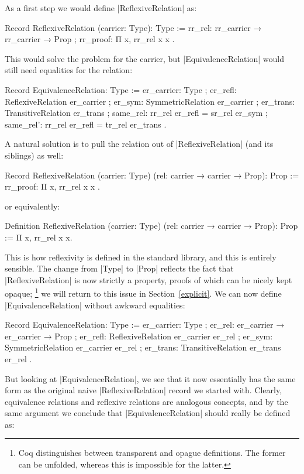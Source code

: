 \documentclass[a4paper,10pt, runningheads]{llncs}
\begin{document}
As a first step we would define |ReflexiveRelation| as:
\begin{code}
  Record ReflexiveRelation (carrier: Type): Type :=
    { rr_rel: rr_carrier → rr_carrier → Prop
    ; rr_proof: Π x, rr_rel x x }.
\end{code}

This would solve the problem for the carrier, but |EquivalenceRelation| would still need equalities
for the relation:
\begin{code}
  Record EquivalenceRelation: Type :=
    { er_carrier: Type
    ; er_refl: ReflexiveRelation er_carrier
    ; er_sym: SymmetricRelation er_carrier
    ; er_trans: TransitiveRelation er_trans
    ; same_rel: rr_rel er_refl = sr_rel er_sym
    ; same_rel': rr_rel er_refl = tr_rel er_trans }.
\end{code}

A natural solution is to pull the relation out of |ReflexiveRelation| (and its siblings) as well:
\begin{code}
  Record ReflexiveRelation (carrier: Type)
                           (rel: carrier → carrier → Prop): Prop :=
    { rr_proof: Π x, rr_rel x x }.
\end{code}
or equivalently:
\begin{code}
  Definition ReflexiveRelation (carrier: Type)
                               (rel: carrier → carrier → Prop): Prop :=
    Π x, rr_rel x x.
\end{code}
This is how reflexivity is defined in the standard library, and this is entirely sensible. The
change from |Type| to |Prop| reflects the fact that |ReflexiveRelation| is now strictly a property,
proofs of which can be nicely kept opaque;%
\footnote{Coq distinguishes between transparent and opague definitions. The former can be unfolded,
whereas this is impossible for the latter.}
we will return to this issue in Section~\ref{explicit}.
We can now define |EquivalenceRelation| without awkward equalities:
\begin{code}
  Record EquivalenceRelation: Type :=
    { er_carrier: Type
    ; er_rel: er_carrier → er_carrier → Prop
    ; er_refl: ReflexiveRelation er_carrier er_rel
    ; er_sym: SymmetricRelation er_carrier er_rel
    ; er_trans: TransitiveRelation er_trans er_rel }.
\end{code}

But looking at |EquivalenceRelation|, we see that it now essentially has the same form as the
original naive |ReflexiveRelation| record we started with. Clearly, equivalence relations
and reflexive relations are analogous concepts, and by the same argument we
conclude that |EquivalenceRelation| should really be defined as:
\end{document}
